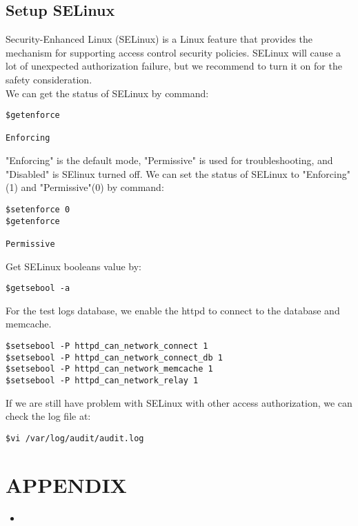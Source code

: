 \documentclass{article}
\newcommand{\PythonSource}[2]{
\begin{itemize}
\item[]
\end{itemize}
}
\begin{document}
\subsection{Setup SELinux}
Security-Enhanced Linux (SELinux) is a Linux feature that provides the mechanism for supporting access control security policies.
SELinux will cause a lot of unexpected authorization failure, but we recommend to turn it on for the safety consideration.\\ 
We can get the status of SELinux by command:
\begin{lstlisting}
$getenforce

Enforcing
\end{lstlisting}
"Enforcing" is the default mode, "Permissive" is used for troubleshooting, and "Disabled" is SElinux turned off.
We can set the status of SELinux to "Enforcing"(1) and "Permissive"(0) by command:
\begin{lstlisting}
$setenforce 0
$getenforce

Permissive
\end{lstlisting}
Get SELinux booleans value by:
\begin{lstlisting}
$getsebool -a
\end{lstlisting}
For the test logs database, we enable the httpd to connect to the database and memcache.
\begin{lstlisting}
$setsebool -P httpd_can_network_connect 1
$setsebool -P httpd_can_network_connect_db 1
$setsebool -P httpd_can_network_memcache 1
$setsebool -P httpd_can_network_relay 1
\end{lstlisting}
If we are still have problem with SELinux with other access authorization, we can check the log file at:
\begin{lstlisting}
$vi /var/log/audit/audit.log
\end{lstlisting}

\section{APPENDIX}
\PythonSource{./fabfile}{Fabric demo script for CentOS 64 Mini}
\end{document}
